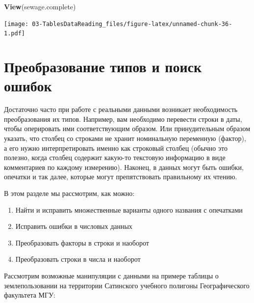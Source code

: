 \documentclass[]{book}
\newenvironment{Shaded}{\begin{snugshade}}{\end{snugshade}}
\newcommand{\KeywordTok}[1]{\textcolor[rgb]{0.13,0.29,0.53}{\textbf{#1}}}
\newcommand{\NormalTok}[1]{#1}
\providecommand{\tightlist}{%
  \setlength{\itemsep}{0pt}\setlength{\parskip}{0pt}}
\begin{document}
\begin{Shaded}
\begin{Highlighting}[]
\KeywordTok{View}\NormalTok{(sewage.complete)}
\end{Highlighting}
\end{Shaded}

\texttt{[image: 03-TablesDataReading\_files/figure-latex/unnamed-chunk-36-1.pdf]}

\section{Преобразование типов и поиск ошибок}\label{data_conversion}

Достаточно часто при работе с реальными данными возникает необходимость
преобразования их типов. Например, вам необходимо перевести строки в
даты, чтобы оперировать ими соответствующим образом. Или принудительным
образом указать, что столбец со строками не хранит номинальную
переменную (фактор), а его нужно интерпретировать именно как строковый
столбец (обычно это полезно, когда столбец содержит какую-то текстовую
информацию в виде комментариев по каждому измерению). Наконец, в данных
могут быть ошибки, опечатки и так далее, которые могут препятствовать
правильному их чтению.

В этом разделе мы рассмотрим, как можно:

\begin{enumerate}
\def\labelenumi{\arabic{enumi}.}
\tightlist
\item
  Найти и исправить множественные варианты одного названия с опечатками
\item
  Исправить ошибки в числовых данных
\item
  Преобразовать факторы в строки и наоборот
\item
  Преобразовать строки в числа и наоборот
\end{enumerate}

Рассмотрим возможные манипуляции с данными на примере таблицы о
землепользовании на территории Сатинского учебного полигоны
Географического факультета МГУ:
\end{document}
